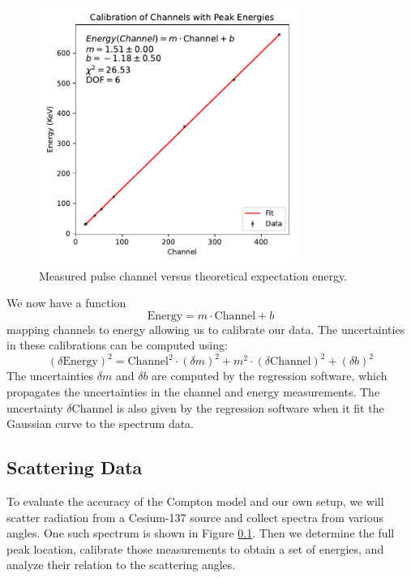 \documentclass[12pt, letterpaper]{article}
\begin{document}
\begin{figure}[!h]
    \centering
    \includegraphics[width=0.75\textwidth]{experiment2/figures/calibration_3.pdf}
    \caption{Measured pulse channel versus theoretical expectation energy.}
    \label{fig:calibration3}
\end{figure}

We now have a function
\[\text{Energy}=m \cdot \text{Channel} +b\]
mapping channels to energy allowing us to calibrate our data. The uncertainties in these calibrations can be computed using:
\[(\delta \text{Energy})^2 = \text{Channel}^2 \cdot (\delta m)^2 + m^2 \cdot (\delta \text{Channel})^2 + (\delta b)^2\]
The uncertainties $\delta m$ and $\delta b$ are computed by the regression software, which propagates the uncertainties in the channel and energy measurements. The uncertainty $\delta \text{Channel}$ is also given by the regression software when it fit the Gaussian curve to the spectrum data. 

\subsection{Scattering Data}

To evaluate the accuracy of the Compton model and our own setup, we will scatter radiation from a Cesium-137 source and collect spectra from various angles. One such spectrum is shown in Figure \ref{}. Then we determine the full peak location, calibrate those measurements to obtain a set of energies, and analyze their relation to the scattering angles. 
\end{document}
